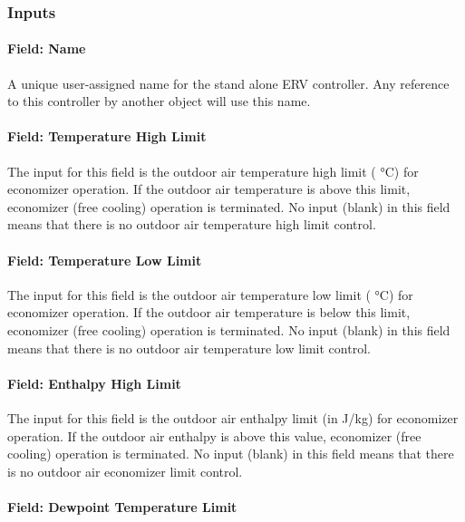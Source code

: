 \subsubsection{Inputs}\label{inputs-3-006}

\paragraph{Field: Name}\label{field-name-3-006}

A unique user-assigned name for the stand alone ERV controller. Any reference to this controller by another object will use this name.

\paragraph{Field: Temperature High Limit}\label{field-temperature-high-limit}

The input for this field is the outdoor air temperature high limit ( °C) for economizer operation. If the outdoor air temperature is above this limit, economizer (free cooling) operation is terminated. No input (blank) in this field means that there is no outdoor air temperature high limit control.

\paragraph{Field: Temperature Low Limit}\label{field-temperature-low-limit}

The input for this field is the outdoor air temperature low limit ( °C) for economizer operation. If the outdoor air temperature is below this limit, economizer (free cooling) operation is terminated. No input (blank) in this field means that there is no outdoor air temperature low limit control.

\paragraph{Field: Enthalpy High Limit}\label{field-enthalpy-high-limit}

The input for this field is the outdoor air enthalpy limit (in J/kg) for economizer operation. If the outdoor air enthalpy is above this value, economizer (free cooling) operation is terminated. No input (blank) in this field means that there is no outdoor air economizer limit control.

\paragraph{Field: Dewpoint Temperature Limit}\label{field-dewpoint-temperature-limit}

